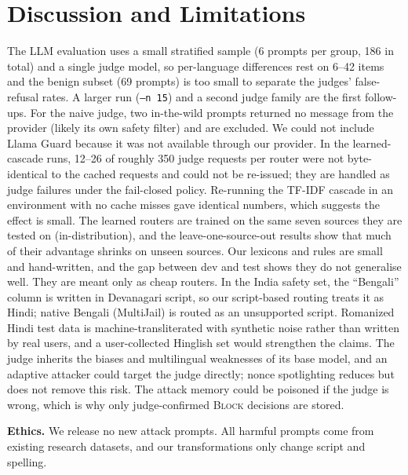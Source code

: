 \documentclass[conference]{IEEEtran}
\begin{document}
\section{Discussion and Limitations}
The LLM evaluation uses a small stratified sample (6 prompts per group, 186 in total) and a single judge model, so per-language differences rest on 6--42 items and the benign subset (69 prompts) is too small to separate the judges' false-refusal rates. A larger run (\texttt{--n 15}) and a second judge family are the first follow-ups. For the naive judge, two in-the-wild prompts returned no message from the provider (likely its own safety filter) and are excluded. We could not include Llama Guard because it was not available through our provider. In the learned-cascade runs, 12--26 of roughly 350 judge requests per router were not byte-identical to the cached requests and could not be re-issued; they are handled as judge failures under the fail-closed policy. Re-running the TF-IDF cascade in an environment with no cache misses gave identical numbers, which suggests the effect is small. The learned routers are trained on the same seven sources they are tested on (in-distribution), and the leave-one-source-out results show that much of their advantage shrinks on unseen sources. Our lexicons and rules are small and hand-written, and the gap between dev and test shows they do not generalise well. They are meant only as cheap routers. In the India safety set, the ``Bengali'' column is written in Devanagari script, so our script-based routing treats it as Hindi; native Bengali (MultiJail) is routed as an unsupported script. Romanized Hindi test data is machine-transliterated with synthetic noise rather than written by real users, and a user-collected Hinglish set would strengthen the claims. The judge inherits the biases and multilingual weaknesses of its base model, and an adaptive attacker could target the judge directly; nonce spotlighting reduces but does not remove this risk. The attack memory could be poisoned if the judge is wrong, which is why only judge-confirmed \textsc{Block} decisions are stored.

\textbf{Ethics.} We release no new attack prompts. All harmful prompts come from existing research datasets, and our transformations only change script and spelling.
\end{document}
